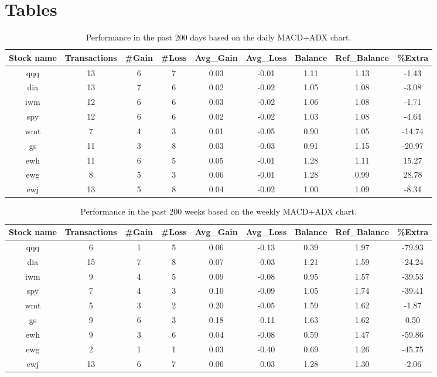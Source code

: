 \section{Tables}

\begin{table}[H]
\caption{Performance in the past 200 days based on the daily MACD+ADX chart.}
\label{tab:days}
\begin{center}
\begin{tabular}{ccccccccc}
Stock name & Transactions & \#Gain & \#Loss & Avg\_Gain & Avg\_Loss & Balance & Ref\_Balance & \%Extra\\
\hline
qqq&13&6&7&0.03&-0.01&1.11&1.13&-1.43\\
dia&13&7&6&0.02&-0.02&1.05&1.08&-3.08\\
iwm&12&6&6&0.03&-0.02&1.06&1.08&-1.71\\
spy&12&6&6&0.02&-0.02&1.03&1.08&-4.64\\
wmt&7&4&3&0.01&-0.05&0.90&1.05&-14.74\\
gs&11&3&8&0.03&-0.03&0.91&1.15&-20.97\\
ewh&11&6&5&0.05&-0.01&1.28&1.11&15.27\\
ewg&8&5&3&0.06&-0.01&1.28&0.99&28.78\\
ewj&13&5&8&0.04&-0.02&1.00&1.09&-8.34\\
\hline
\end{tabular}
\end{center}
\end{table}

\begin{table}[H]
\caption{Performance in the past 200 weeks based on the weekly MACD+ADX chart.}
\label{tab:weeks}
\begin{center}
\begin{tabular}{ccccccccc}
Stock name & Transactions & \#Gain & \#Loss & Avg\_Gain & Avg\_Loss & Balance & Ref\_Balance & \%Extra\\   
\hline
qqq&6&1&5&0.06&-0.13&0.39&1.97&-79.93\\
dia&15&7&8&0.07&-0.03&1.21&1.59&-24.24\\
iwm&9&4&5&0.09&-0.08&0.95&1.57&-39.53\\
spy&7&4&3&0.10&-0.09&1.05&1.74&-39.41\\
wmt&5&3&2&0.20&-0.05&1.59&1.62&-1.87\\
gs&9&6&3&0.18&-0.11&1.63&1.62&0.50\\
ewh&9&3&6&0.04&-0.08&0.59&1.47&-59.86\\
ewg&2&1&1&0.03&-0.40&0.69&1.26&-45.75\\
ewj&13&6&7&0.06&-0.03&1.28&1.30&-2.06\\
\hline
\end{tabular}
\end{center}
\end{table}

